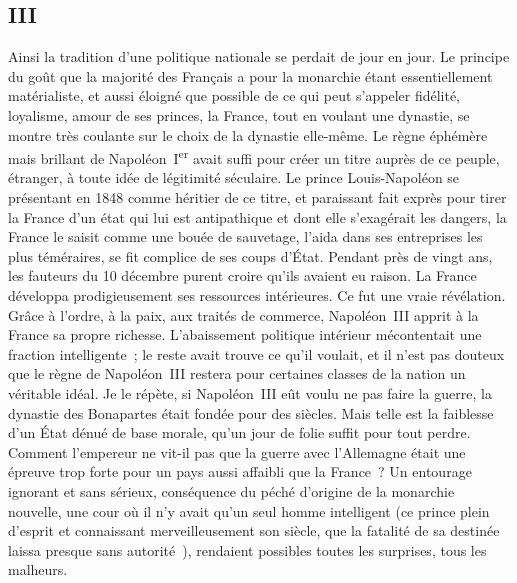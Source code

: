 \documentclass[french,twoside]{book} %
\begin{document}
\subsection[{III}]{III}
\noindent Ainsi la tradition d’une politique nationale se perdait de jour en jour. Le principe du goût que la majorité des Français a pour la monarchie étant essentiellement matérialiste, et aussi éloigné que possible de ce qui peut s’appeler fidélité, loyalisme, amour de ses princes, la France, tout en voulant une dynastie, se montre très coulante sur le choix de la dynastie elle-même. Le règne éphémère mais brillant de Napoléon I\textsuperscript{er} avait suffi pour créer un titre auprès de ce peuple, étranger, à toute idée de légitimité séculaire. Le prince Louis-Napoléon se présentant en 1848 comme héritier de ce titre, et paraissant fait exprès pour tirer la France d’un état qui lui est antipathique et dont elle s’exagérait les dangers, la France le saisit comme une bouée de sauvetage, l’aida dans ses entreprises les plus téméraires, se fit complice de ses coups d’État. Pendant près de vingt ans, les fauteurs du 10 décembre purent croire qu’ils avaient eu raison. La France développa prodigieusement ses ressources intérieures. Ce fut une vraie révélation. Grâce à l’ordre, à la paix, aux traités de commerce, Napoléon III apprit à la France sa propre richesse. L’abaissement politique intérieur mécontentait une fraction intelligente ; le reste avait trouve ce qu’il voulait, et il n’est pas douteux que le règne de Napoléon III restera pour certaines classes de la nation un véritable idéal. Je le répète, si Napoléon III eût voulu ne pas faire la guerre, la dynastie des Bonapartes était fondée pour des siècles. Mais telle est la faiblesse d’un État dénué de base morale, qu’un jour de folie suffit pour tout perdre. Comment l’empereur ne vit-il pas que la guerre avec l’Allemagne était une épreuve trop forte pour un pays aussi affaibli que la France ? Un entourage ignorant et sans sérieux, conséquence du péché d’origine de la monarchie nouvelle, une cour où il n’y avait qu’un seul homme intelligent (ce prince plein d’esprit et connaissant merveilleusement son siècle, que la fatalité de sa destinée laissa presque sans autorité ), rendaient possibles toutes les surprises, tous les malheurs.\par
\end{document}
